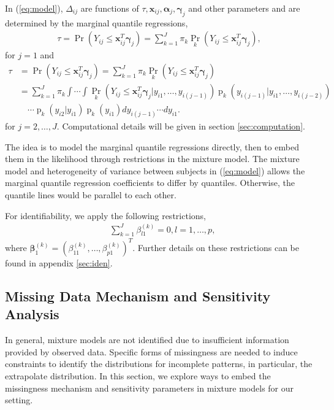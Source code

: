 \documentclass[12pt]{article}
\DeclareMathOperator{\pr}{p}
\DeclareMathOperator{\prob}{Pr}
\begin{document}
In (\ref{eq:model}), $\Delta_{ij}$ are functions of $\tau, \bm x_{ij},
\bm \alpha_j, \bm \gamma_j$ and other parameters and are determined by
the marginal quantile regressions,
\begin{align}
  \label{eq:deltaeqn1}
  \tau = \prob (Y_{ij} \leq \bm x_{ij}^T \bm \gamma_j ) = \sum_{k=1}^J
  \pi_k\prob_k (Y_{ij} \leq \bm x_{ij}^T \bm \gamma_j ),
\end{align}
for $j = 1$ and
\begin{align}\label{eq:deltaeqn2}
  \tau &= \prob (Y_{ij} \leq \bm x_{ij}^{T} \bm \gamma_j ) =
  \sum_{k=1}^J
  \pi_k\prob_k (Y_{ij} \leq \bm x_{ij}^{T} \bm \gamma_j ) \\
  & = \sum_{k=1}^J \pi_k \int\cdots \int \prob_k (Y_{ij} \leq \bm
  x_{ij}^{T} \bm \gamma_j |y_{i1},\ldots,
  y_{i(j-1)}) \pr_k (y_{i(j-1)}| y_{i1}, \ldots, y_{i(j-2)})  \nonumber \\
  & \quad \cdots \pr_k (y_{i2}| y_{i1}) \pr_k(y_{i1})
  dy_{i(j-1)}\cdots dy_{i1}. \nonumber
\end{align}
for $j = 2, \ldots, J$. Computational details will be given in
section \ref{sec:computation}.

The idea is to model the marginal quantile regressions directly, then
to embed them in the likelihood through restrictions in the mixture
model. The mixture model and heterogeneity of variance between
subjects in (\ref{eq:model}) allows the marginal quantile regression coefficients to
differ by quantiles. Otherwise, the quantile lines would be parallel
to each other.

For identifiability, we apply the following restrictions,
\begin{align*}
  & \sum_{k=1}^J \beta_{l1}^{(k)} = 0, l = 1,\ldots, p,
\end{align*}
where $\bm \beta_1^{(k)} = (\beta_{11}^{(k)}, \ldots,
\beta_{p1}^{(k)})^{T}$. Further details on these restrictions can be
found in appendix \ref{sec:iden}.

\subsection{Missing Data Mechanism and Sensitivity Analysis}
\label{sec:sa}

In general, mixture models are not identified due to insufficient
information provided by observed data. Specific forms of missingness
are needed to induce constraints to identify the distributions for
incomplete patterns, in particular, the extrapolate distribution. In
this section, we explore ways to embed the missingness mechanism and
sensitivity parameters in mixture models for our setting.
\end{document}
